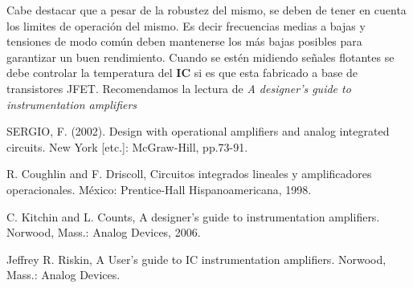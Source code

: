  Cabe destacar que a pesar de la robustez del mismo, se deben de tener en cuenta los limites de operación del mismo. Es decir frecuencias medias a bajas y tensiones de modo común deben mantenerse los más bajas posibles para garantizar un buen rendimiento.
Cuando se estén midiendo señales flotantes se debe controlar la temperatura del \textbf{IC} si es que esta fabricado a base de transistores JFET.
Recomendamos la lectura de \textit{A designer's guide to instrumentation amplifiers}


 	
\begin{thebibliography}{9}
	
	SERGIO, F. (2002). Design with operational amplifiers and analog integrated circuits. New York [etc.]: McGraw-Hill, pp.73-91.	
	
	R. Coughlin and F. Driscoll, Circuitos integrados lineales y amplificadores operacionales. México: Prentice-Hall Hispanoamericana, 1998.
	
	C. Kitchin and L. Counts, A designer's guide to instrumentation amplifiers. Norwood, Mass.: Analog Devices, 2006.
	
	Jeffrey R. Riskin, A User's guide to IC instrumentation amplifiers. Norwood, Mass.: Analog Devices.
	
\end{thebibliography}
